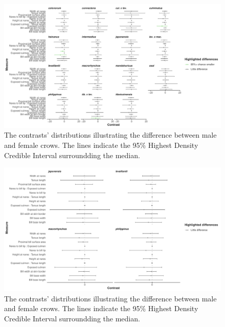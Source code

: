\documentclass[10pt,a4paper]{article}
\begin{document}
\begin{figure}
\includegraphics[width=0.9\linewidth]{../Figures/klockSpecies_HDCI_intraSubspeciesSex_contrasts} \caption{The contrasts' distributions illustrating the difference between male and female crows. The lines indicate the 95\% Highest Density Credible Interval surroundding the median.}\label{fig:sexKlockContrasts}
\end{figure}

\begin{figure}
\includegraphics[width=0.9\linewidth]{../Figures/martSpecies_HDCI_intraSubspeciesSex_contrasts} \caption{The contrasts' distributions illustrating the difference between male and female crows. The lines indicate the 95\% Highest Density Credible Interval surroundding the median.}\label{fig:sexMartensContrasts}
\end{figure}
\end{document}

